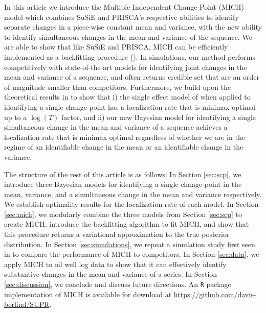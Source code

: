 In this article we introduce the Multiple Independent Change-Point (MICH) model which combines SuSiE and PRISCA's respective abilities to identify separate changes in a piece-wise constant mean and variance, with the new ability to identify simultaneous changes in the mean and variance of the sequence. We are able to show that like SuSiE and PRISCA, MICH can be efficiently implemented as a backfitting procedure (\citealp{Friedman81, Breiman85}). In simulations, our method performs competitively with state-of-the-art models for identifying joint changes in the mean and variance of a sequence, and often returns credible set that are an order of magnitude smaller than competitors. Furthermore, we build upon the theoretical results in \cite{Cappello22} to show that i) the single effect model of \cite{Wang20} when applied to identifying a single change-point has a localization rate that is minimax optimal up to a $\log(T)$ factor, and ii) our new Bayesian model for identifying a single simultaneous change in the mean and variance of a sequence achieves a localization rate that is minimax optimal regardless of whether we are in the regime of an identifiable change in the mean or an identifiable change in the variance.  

The structure of the rest of this article is as follows: In Section \ref{sec:scp}, we introduce three Bayesian models for identifying a single change-point in the mean, variance, and a simultaneous change in the mean and variance respectively. We establish optimality results for the localization rate of each model. In Section \ref{sec:mich}, we modularly combine the three models from Section \ref{sec:scp} to create MICH, introduce the backfitting algorithm to fit MICH, and show that this procedure returns a variational approximation to the true posterior distribution. In Section \ref{sec:simulations}, we repeat a simulation study first seen in \cite{Pein17} to compare the performance of MICH to competitors. In Section \ref{sec:data}, we apply MICH to oil well log data to show that it can effectively identify substantive changes in the mean and variance of a series. In Section \ref{sec:discussion}, we conclude and discuss future directions. An \texttt{R} package implementation of MICH is available for download at \url{https://github.com/davis-berlind/SUPR}.
